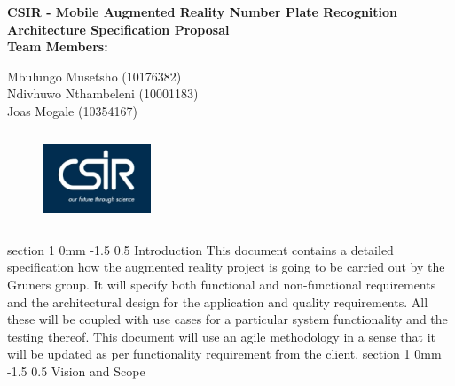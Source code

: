 \documentclass[12pt]{article}
\makeatletter
\newcommand{\Title}{CSIR - Mobile Augmented Reality Number Plate Recognition} %
\renewcommand{\section}{\@startsection
   {section}%
   {1}%
   {0mm}%
   {-1.5\baselineskip}%
   {0.5\baselineskip}%
   {\sffamily\bfseries\upshape\normalsize}}%
\makeatother
\begin{document}
        \vspace{4em}
        
        \begin{center}%
        
          \LARGE \bf \Title \\[4em]
          \LARGE {\bf Architecture Specification Proposal}\\[1em]
          \LARGE {\bf Team Members:}\\[2em]
          \large
          
             Mbulungo Musetsho                          (10176382)  \\[1em]
             Ndivhuwo Nthambeleni 						(10001183)	\\[1em]
             Joas Mogale 								(10354167)	\\[1em]
            
        \end{center}%
        \begin{figure}[h]
                                           \centering
                                           \includegraphics[width=1.27in, height=1.09in]{Pictures/csir.png}
                					\end{figure}
                					\FloatBarrier
        

        \newpage
        \tableofcontents    
                \newpage
                \section{Introduction}
                		This document contains a detailed specification how the augmented reality project is going to be carried out by the Gruners group. It will specify both functional and non-functional requirements and the architectural design for the application and quality requirements. All these will be coupled with use cases for a particular system functionality and the testing thereof. This document will use an agile methodology in a sense that it will be updated as per functionality requirement from the client. 
                \section{Vision and Scope}
\end{document}

